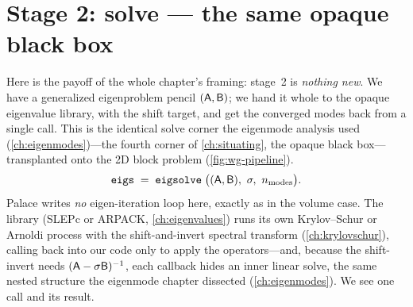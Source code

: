 \section{Stage 2: solve --- the same opaque black box}
\label{sec:solve}

Here is the payoff of the whole chapter's framing: stage~2 is \emph{nothing new}.
We have a generalized eigenproblem pencil $(\mathsf{A},\mathsf{B})$; we hand it whole to
the opaque eigenvalue library, with the shift target, and get the converged modes
back from a single call. This is the identical solve corner the eigenmode analysis
used (\cref{ch:eigenmodes})---the fourth corner of \cref{ch:situating}, the opaque
black box---transplanted onto the 2D block problem (\cref{fig:wg-pipeline}).
\[
  \texttt{eigs} \;=\; \texttt{eigsolve}\;\bigl((\mathsf{A},\mathsf{B}),\ \sigma,\
  n_{\text{modes}}\bigr).
\]
Palace writes \emph{no} eigen-iteration loop here, exactly as in the volume case.
The library (SLEPc or ARPACK, \cref{ch:eigenvalues}) runs its own Krylov--Schur or
Arnoldi process with the shift-and-invert spectral transform
(\cref{ch:krylovschur}), calling back into our code only to apply the operators---and,
because the shift-invert needs $(\mathsf{A}-\sigma\mathsf{B})^{-1}$, each callback hides
an inner linear solve, the same nested structure the eigenmode chapter dissected
(\cref{ch:eigenmodes}). We see one call and its result.

